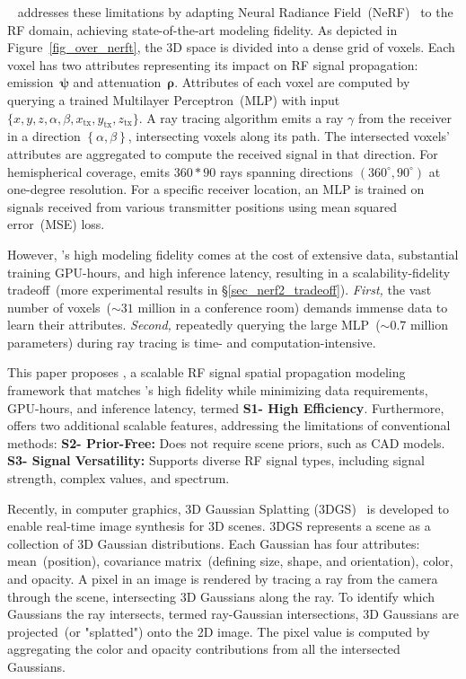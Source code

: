 \nerft~\cite{zhao2023nerf} addresses these limitations by adapting Neural Radiance Field~(NeRF)~\cite{mildenhall2021nerf} to the RF domain, achieving state-of-the-art modeling fidelity.
As depicted in Figure~\ref{fig_over_nerft}, the 3D space is divided into a dense grid of voxels.
Each voxel has two attributes representing its impact on RF signal propagation: emission~\(\boldsymbol{\psi}\) and attenuation~\(\boldsymbol{\rho}\).
Attributes of each voxel are computed by querying a trained Multilayer Perceptron~(MLP) with input~\(\{x, y, z, \alpha, \beta, x_{\text{tx}}, y_{\text{tx}}, z_{\text{tx}}\}\).
A ray tracing algorithm emits a ray \(\gamma\) from the receiver in a direction \(\left\{\alpha, \beta\right\}\), intersecting voxels along its path.  
The intersected voxels' attributes are aggregated to compute the received signal in that direction.  
For hemispherical coverage, \nerft emits \(360*90\) rays spanning directions \((360^\circ, 90^\circ)\) at one-degree resolution.
For a specific receiver location, an MLP is trained on signals received from various transmitter positions using mean squared error~(MSE) loss.


However, \nerft's high modeling fidelity comes at the cost of extensive data, substantial training GPU-hours, and high inference latency, resulting in a scalability-fidelity tradeoff~(more experimental results in §\ref{sec_nerf2_tradeoff}).  
\textit{First,} the vast number of voxels~(\(\mathord{\sim}31\) million in a conference room) demands immense data to learn their attributes.  
\textit{Second,} repeatedly querying the large MLP~(\(\mathord{\sim}0.7\) million parameters) during ray tracing is time- and computation-intensive.


This paper proposes \ourSystem, a scalable RF signal spatial propagation modeling framework that matches \nerft's high fidelity while minimizing data requirements, GPU-hours, and inference latency, termed \textbf{S1- High Efficiency}.
Furthermore, \ourSystem offers two additional scalable features, addressing the limitations of conventional methods:  
\textbf{S2- Prior-Free:} Does not require scene priors, such as CAD models.  
\textbf{S3- Signal Versatility:} Supports diverse RF signal types, including signal strength, complex values, and spectrum.



Recently, in computer graphics, 3D Gaussian Splatting (3DGS)~\cite{kerbl20233d} is developed to enable real-time image synthesis for 3D scenes.  
3DGS represents a scene as a collection of 3D Gaussian distributions. Each Gaussian has four attributes: mean~(position), covariance matrix~(defining size, shape, and orientation), color, and opacity.  
A pixel in an image is rendered by tracing a ray from the camera through the scene, intersecting 3D Gaussians along the ray.
To identify which Gaussians the ray intersects, termed ray-Gaussian intersections, 3D Gaussians are projected~(or "splatted") onto the 2D image.
The pixel value is computed by aggregating the color and opacity contributions from all the intersected Gaussians.



